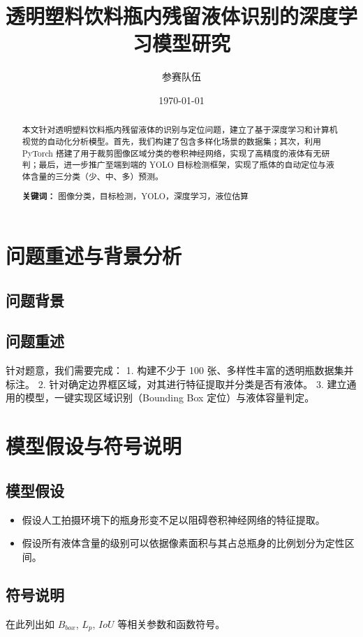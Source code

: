 \documentclass[12pt,a4paper,UTF8]{ctexart}
\title{透明塑料饮料瓶内残留液体识别的深度学习模型研究}
\author{参赛队伍}
\date{\today}
\begin{document}
\maketitle

\begin{abstract}
本文针对透明塑料饮料瓶内残留液体的识别与定位问题，建立了基于深度学习和计算机视觉的自动化分析模型。首先，我们构建了包含多样化场景的数据集；其次，利用 PyTorch 搭建了用于裁剪图像区域分类的卷积神经网络，实现了高精度的液体有无研判；最后，进一步推广至端到端的 YOLO 目标检测框架，实现了瓶体的自动定位与液体含量的三分类（少、中、多）预测。

\textbf{关键词：} 图像分类，目标检测，YOLO，深度学习，液位估算
\end{abstract}

\newpage
\tableofcontents
\newpage

\section{问题重述与背景分析}
\subsection{问题背景}
\subsection{问题重述}
针对题意，我们需要完成：
1. 构建不少于 100 张、多样性丰富的透明瓶数据集并标注。
2. 针对确定边界框区域，对其进行特征提取并分类是否有液体。
3. 建立通用的模型，一键实现区域识别（Bounding Box 定位）与液体容量判定。

\section{模型假设与符号说明}
\subsection{模型假设}
\begin{itemize}
    \item 假设人工拍摄环境下的瓶身形变不足以阻碍卷积神经网络的特征提取。
    \item 假设所有液体含量的级别可以依据像素面积与其占总瓶身的比例划分为定性区间。
\end{itemize}
\subsection{符号说明}
在此列出如 $B_{box}$, $L_p$, $IoU$ 等相关参数和函数符号。
\end{document}

